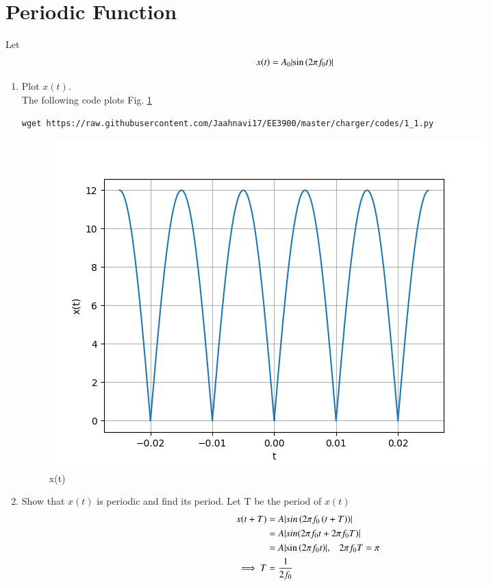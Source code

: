 \documentclass[journal,12pt,twocolumn]{IEEEtran}
\DeclarePairedDelimiter\abs{\lvert}{\rvert}%
\renewcommand\thesection{\arabic{section}}
\begin{document}
\section{Periodic Function}
Let 
\begin{align}
	x(t) &= A_0\abs{\sin\brak{2\pi f_0 t}}\label{eq:10-orig-diff-def}
\end{align}
\begin{enumerate}[label=\thesection.\arabic*
,ref=\thesection.\theenumi]
\item Plot $x(t)$.
\\\solution The following code plots Fig. \ref{fig:xt}
	\begin{lstlisting}
wget https://raw.githubusercontent.com/Jaahnavi17/EE3900/master/charger/codes/1_1.py
\end{lstlisting}
	\begin{figure}[h!]
	    \centering
	    \includegraphics[width=\columnwidth]{figures/1_1.png}
	    \caption{x(t) }
	    \label{fig:xt}
	\end{figure}

\item Show that $x(t)$ is periodic and find its period.
Let T be the period of $x(t)$
\begin{align}
    x(t+T) &= A\abs{sin\brak{2\pi f_0\brak{t+T}}}\\
    &= A\abs{sin(2\pi f_0t+2\pi f_0T)}\\
    &= A\abs{\sin\brak{2\pi f_0 t}} \text,\quad 2\pi f_0T=\pi\\
    \implies T&= \frac{1}{2f_0}
\end{align}
\end{enumerate}
\end{document}
